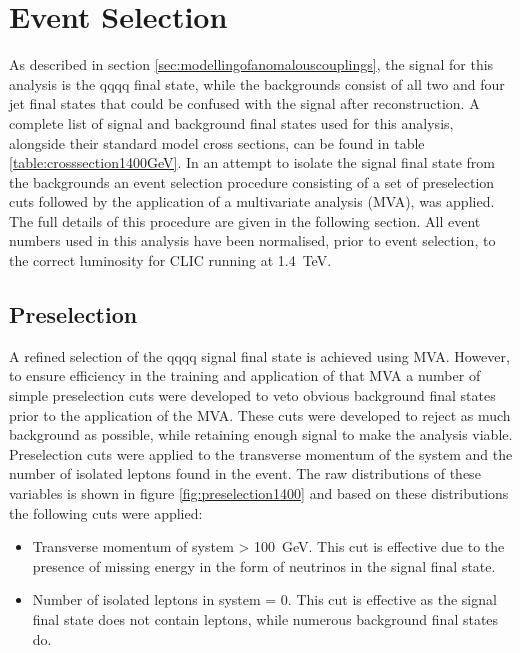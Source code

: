 
\section{Event Selection}
\label{sec:eventselection}
As described in section \ref{sec:modellingofanomalouscouplings}, the signal for this analysis is the \nu{\nu}qqqq final state, while the backgrounds consist of all two and four jet final states that could be confused with the signal after reconstruction.  A complete list of signal and background final states used for this analysis, alongside their standard model cross sections, can be found in table \ref{table:crosssection1400GeV}.  In an attempt to isolate the signal final state from the backgrounds an event selection procedure consisting of a set of preselection cuts followed by the application of a multivariate analysis (MVA), was applied.  The full details of this procedure are given in the following section.  All event numbers used in this analysis have been normalised, prior to event selection, to the correct luminosity for CLIC running at 1.4~TeV.


\subsection{Preselection}
\label{sec:preselection1400GeV}
A refined selection of the \nu{\nu}qqqq signal final state is achieved using MVA.  However, to ensure efficiency in the training and application of that MVA a number of simple preselection cuts were developed to veto obvious background final states prior to the application of the MVA.  These cuts were developed to reject as much background as possible, while retaining enough signal to make the analysis viable.  Preselection cuts were applied to the transverse momentum of the system and the number of isolated leptons found in the event.  The raw distributions of these variables is shown in figure \ref{fig:preselection1400} and based on these distributions the following cuts were applied:

\begin{itemize}
\item Transverse momentum of system > 100~GeV.  This cut is effective due to the presence of missing energy in the form of neutrinos in the signal final state.
\item Number of isolated leptons in system = 0.  This cut is effective as the signal final state does not contain leptons, while numerous background final states do.  
\end{itemize}

